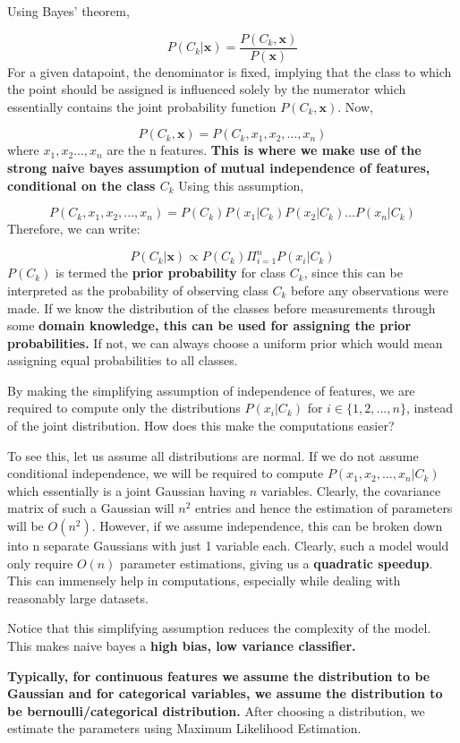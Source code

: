 \documentclass[conference]{IEEEtran}
\begin{document}
Using Bayes' theorem,

$$ P(C_k|\mathbf{x}) = \frac{P(C_k, \mathbf{x})}{P(\mathbf{x})} $$ For a given datapoint, the denominator is fixed, implying that the class to which the point should be assigned is influenced solely by the numerator which essentially contains the joint probability function $P(C_k, \mathbf{x})$. Now,

$$ P(C_k, \mathbf{x}) = P(C_k, x_1, x_2, ..., x_n)$$ where $x_1, x_2..., x_n$ are the n features. \textbf{This is where we make use of the strong naive bayes assumption of mutual independence of features, conditional on the class $C_k$} Using this assumption,

$$P(C_k, x_1, x_2, ..., x_n) = P(C_k)P(x_1|C_k)P(x_2|C_k)...P(x_n|C_k)$$ Therefore, we can write:

$$ P(C_k|\mathbf{x}) \propto  P(C_k) \Pi_{i=1}^{n}P(x_i|C_k)$$ $P(C_k)$ is termed the \textbf{prior probability} for class $C_k$, since this can be interpreted as the probability of observing class $C_k$ before any observations were made. If we know the distribution of the classes before measurements through some \textbf{domain knowledge, this can be used for assigning the prior probabilities.} If not, we can always choose a uniform prior which would mean assigning equal probabilities to all classes.

By making the simplifying assumption of independence of features, we are required to compute only the distributions $P(x_i|C_k)$ for $i \in \{1, 2, ...,n\}$, instead of the joint distribution. How does this make the computations easier?

To see this, let us assume all distributions are normal. If we do not assume conditional independence, we will be required to compute $P(x_1, x_2,..., x_n|C_k)$ which essentially is a joint Gaussian having $n$ variables. Clearly, the covariance matrix of such a Gaussian will $n^2$ entries and hence the estimation of parameters will be $O(n^2)$. However, if we assume independence, this can be broken down into n separate Gaussians with just 1 variable each. Clearly, such a model would only require $O(n)$ parameter estimations, giving us a \textbf{quadratic speedup}. This can immensely help in computations, especially while dealing with reasonably large datasets.

Notice that this simplifying assumption reduces the complexity of the model. This makes naive bayes a \textbf{high bias, low variance classifier.} 

\textbf{Typically, for continuous features we assume the distribution to be Gaussian and for categorical variables, we assume the distribution to be bernoulli/categorical distribution.} After choosing a distribution, we estimate the parameters using Maximum Likelihood Estimation.
\end{document}
